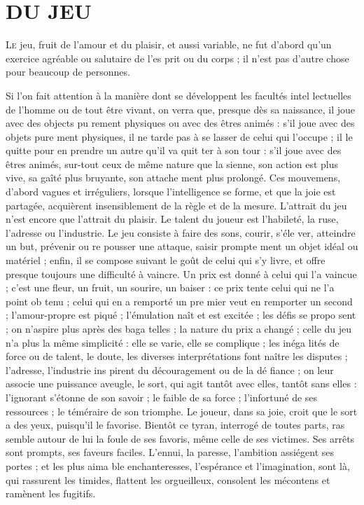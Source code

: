 \chapter[Du Jeu]{DU JEU}

\lettrine{L}{e} jeu, fruit de l'amour et du plaisir,
et aussi variable, ne fut d'abord qu'un
exercice agréable ou salutaire de l'es%
prit ou du corps ; il n'est pas d'autre
chose pour beaucoup de personnes.

Si l'on fait attention à la manière
dont se développent les facultés intel%
lectuelles de l'homme ou de tout être
vivant, on verra que, presque dès sa
naissance, il joue avec des objects pu%
rement physiques ou avec des êtres
animés : s'il joue avec des objets pure%
ment physiques, il ne tarde pas à se
lasser de celui qui l'occupe ; il le quitte
pour en prendre un autre qu'il va quit%
ter à son tour : s'il joue avec des êtres
animés, sur-tout ceux de même nature
que la sienne, son action est plus vive,
sa gaîté plus bruyante, son attache%
ment plus prolongé. Ces mouvemens,
d'abord vagues et irréguliers, lorsque
l'intelligence se forme, et que la joie est
partagée, acquièrent insensiblement
de la règle et de la mesure. L'attrait du
jeu n'est encore que l'attrait du plaisir.
Le talent du joueur est l'habileté, la
ruse, l'adresse ou l'industrie. Le jeu
consiste à faire des sons, courir, s'éle%
ver, atteindre un but, prévenir ou re%
pousser une attaque, saisir prompte%
ment un objet idéal ou matériel ; enfin,
il se compose suivant le goût de celui
qui s'y livre, et offre presque toujours
une difficulté à vaincre. Un prix est
donné à celui qui l'a vaincue ; c'est une
fleur, un fruit, un sourire, un baiser :
ce prix tente celui qui ne l'a point ob%
tenu ; celui qui en a remporté un pre%
mier veut en remporter un second ;
l'amour-propre est piqué ; l'émulation
naît et est excitée ; les défis se propo%
sent ; on n'aspire plus après des baga%
telles ; la nature du prix a changé ; celle
du jeu n'a plus la même simplicité : elle
se varie, elle se complique ; les inéga%
lités de force ou de talent, le doute,
les diverses interprétations font naître
les disputes ; l'adresse, l'industrie ins%
pirent du découragement ou de la dé%
fiance ; on leur associe une puissance
aveugle, le sort, qui agit tantôt avec
elles, tantôt sans elles : l'ignorant
s'étonne de son savoir ; le faible de sa
force ; l'infortuné de ses ressources ; le
téméraire de son triomphe. Le joueur,
dans sa joie, croit que le sort a des
yeux, puisqu'il le favorise. Bientôt ce
tyran, interrogé de toutes parts, ras%
semble autour de lui la foule de ses
favoris, même celle de ses victimes.
Ses arrêts sont prompts, ses faveurs
faciles. L'ennui, la paresse, l'ambition
assiégent ses portes ; et les plus aima%
ble enchanteresses, l'espérance et
l'imagination, sont là, qui rassurent
les timides, flattent les orgueilleux,
consolent les mécontens et ramènent 
les fugitifs.

